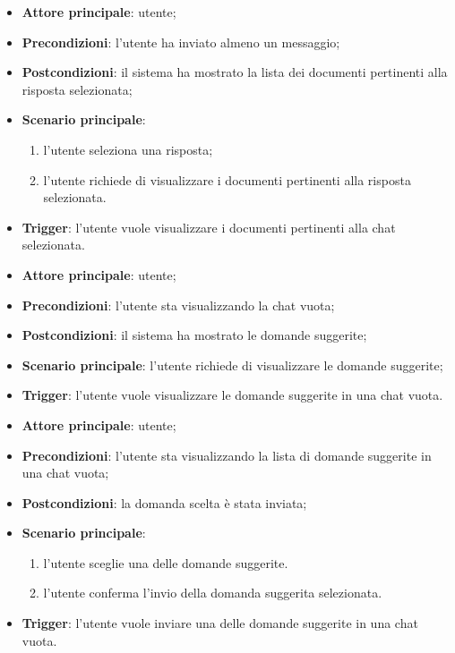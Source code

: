 \documentclass[10pt, a4paper]{article}
\begin{document}
    \begin{itemize}
        \item \textbf{Attore principale}: utente;
        \item \textbf{Precondizioni}: l’utente ha inviato almeno un messaggio;
        \item \textbf{Postcondizioni}: il sistema ha mostrato la lista dei documenti pertinenti alla risposta selezionata;
        \item \textbf{Scenario principale}:
            \begin{enumerate}
                \item l’utente seleziona una risposta;
                \item l’utente richiede di visualizzare i documenti pertinenti alla risposta selezionata.
            \end{enumerate}
        \item \textbf{Trigger}: l’utente vuole visualizzare i documenti pertinenti alla chat selezionata.
    \end{itemize}

    \begin{itemize}
        \item \textbf{Attore principale}: utente;
        \item \textbf{Precondizioni}: l’utente sta visualizzando la chat vuota;
        \item \textbf{Postcondizioni}: il sistema ha mostrato le domande suggerite;
        \item \textbf{Scenario principale}: l’utente richiede di visualizzare le domande suggerite;
        \item \textbf{Trigger}: l’utente vuole visualizzare le domande suggerite in una chat vuota.
    \end{itemize}

    \begin{itemize}
        \item \textbf{Attore principale}: utente;
        \item \textbf{Precondizioni}: l’utente sta visualizzando la lista di domande suggerite in una chat vuota;
        \item \textbf{Postcondizioni}: la domanda scelta è stata inviata;
        \item \textbf{Scenario principale}:
        \begin{enumerate}
            \item l’utente sceglie una delle domande suggerite.
            \item l’utente conferma l'invio della domanda suggerita selezionata.
        \end{enumerate}
        \item \textbf{Trigger}: l’utente vuole inviare una delle domande suggerite in una chat vuota.
    \end{itemize}
\end{document}
